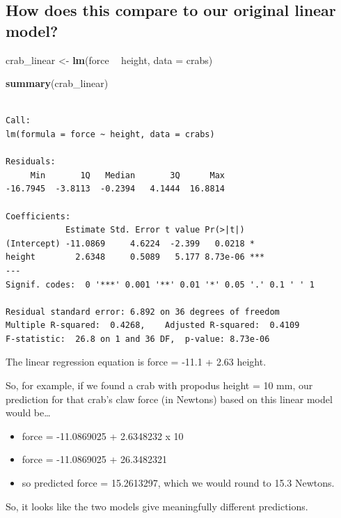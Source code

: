 \documentclass[
]{book}
\newenvironment{Shaded}{\begin{snugshade}}{\end{snugshade}}
\newcommand{\DataTypeTok}[1]{\textcolor[rgb]{0.13,0.29,0.53}{#1}}
\newcommand{\KeywordTok}[1]{\textcolor[rgb]{0.13,0.29,0.53}{\textbf{#1}}}
\newcommand{\NormalTok}[1]{#1}
\newcommand{\OperatorTok}[1]{\textcolor[rgb]{0.81,0.36,0.00}{\textbf{#1}}}
\newcommand{\StringTok}[1]{\textcolor[rgb]{0.31,0.60,0.02}{#1}}
\providecommand{\tightlist}{%
  \setlength{\itemsep}{0pt}\setlength{\parskip}{0pt}}
\begin{document}
\hypertarget{how-does-this-compare-to-our-original-linear-model}{%
\subsection{How does this compare to our original linear model?}\label{how-does-this-compare-to-our-original-linear-model}}

\begin{Shaded}
\begin{Highlighting}[]
\NormalTok{crab_linear <-}\StringTok{ }\KeywordTok{lm}\NormalTok{(force }\OperatorTok{~}\StringTok{ }\NormalTok{height, }\DataTypeTok{data =}\NormalTok{ crabs)}

\KeywordTok{summary}\NormalTok{(crab_linear)}
\end{Highlighting}
\end{Shaded}

\begin{verbatim}

Call:
lm(formula = force ~ height, data = crabs)

Residuals:
     Min       1Q   Median       3Q      Max 
-16.7945  -3.8113  -0.2394   4.1444  16.8814 

Coefficients:
            Estimate Std. Error t value Pr(>|t|)    
(Intercept) -11.0869     4.6224  -2.399   0.0218 *  
height        2.6348     0.5089   5.177 8.73e-06 ***
---
Signif. codes:  0 '***' 0.001 '**' 0.01 '*' 0.05 '.' 0.1 ' ' 1

Residual standard error: 6.892 on 36 degrees of freedom
Multiple R-squared:  0.4268,	Adjusted R-squared:  0.4109 
F-statistic:  26.8 on 1 and 36 DF,  p-value: 8.73e-06
\end{verbatim}

The linear regression equation is force = -11.1 + 2.63 height.

So, for example, if we found a crab with propodus height = 10 mm, our prediction for that crab's claw force (in Newtons) based on this linear model would be\ldots{}

\begin{itemize}
\tightlist
\item
  force = -11.0869025 + 2.6348232 x 10
\item
  force = -11.0869025 + 26.3482321
\item
  so predicted force = 15.2613297, which we would round to 15.3 Newtons.
\end{itemize}

So, it looks like the two models give meaningfully different predictions.
\end{document}
